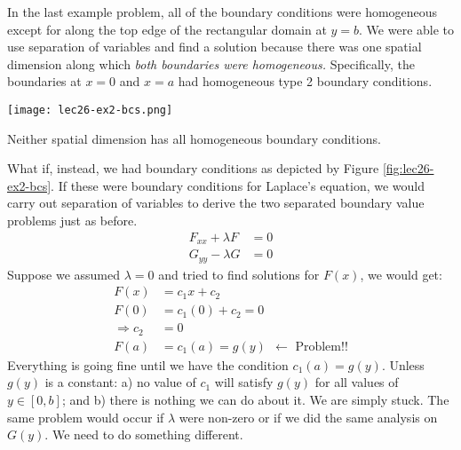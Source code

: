 In the last example problem, all of the boundary conditions were homogeneous except for along the top edge of the rectangular domain at $y=b$.  We were able to use separation of variables and find a solution because there was one spatial dimension along which \emph{both boundaries were homogeneous.}  Specifically, the boundaries at $x=0$ and $x=a$ had homogeneous type 2 boundary conditions.   

\begin{marginfigure}
\texttt{[image: lec26-ex2-bcs.png]}
\caption{Neither spatial dimension has all homogeneous boundary conditions.}
\label{fig:lec26-ex2-bcs}
\end{marginfigure}
What if, instead, we had boundary conditions as depicted by Figure \ref{fig:lec26-ex2-bcs}.  If these were boundary conditions for Laplace's equation, we would carry out separation of variables to derive the two separated boundary value problems just as before.
\begin{align*}
F_{xx}+\lambda F &= 0 \\
G_{yy}-\lambda G &= 0
\end{align*}
Suppose we assumed $\lambda = 0$ and tried to find solutions for $F(x)$, we would get:
\begin{align*}
F(x) &= c_1 x + c_2 \\
F(0) &= c_1 (0) +  c_2 = 0 \\
\Rightarrow c_2 &= 0 \\
F(a) &= c_1(a) = g(y) \ \ \leftarrow \text{  Problem!!}
\end{align*}
Everything is going fine until we have the condition $c_1(a) = g(y)$.  Unless $g(y)$ is a constant: a) no value of $c_1$ will satisfy $g(y)$ for all values of $y \in [0,b]$; and b) there is nothing we can do about it.  We are simply stuck.  The same problem would occur if $\lambda$ were non-zero or if we did the same analysis on $G(y)$.  We need to do something different.


